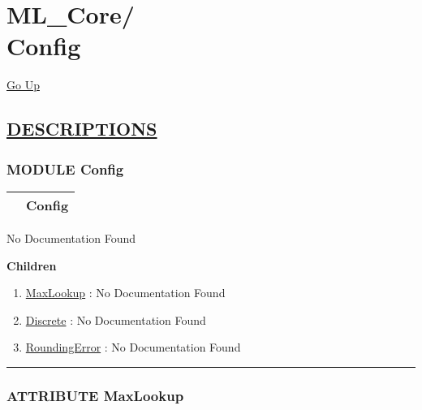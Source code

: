 \chapter*{\color{headfile}
{\large ML\_Core\slash\hspace{0pt}}
 \\
Config
}
\hypertarget{ecldoc:toc:ML_Core.Config}{}
\hyperlink{ecldoc:toc:root/ML_Core}{Go Up}


\section*{\underline{\textsf{DESCRIPTIONS}}}
\subsection*{\textsf{\colorbox{headtoc}{\color{white} MODULE}
Config}}

\hypertarget{ecldoc:ML_Core.Config}{}

{\renewcommand{\arraystretch}{1.5}
\begin{tabularx}{\textwidth}{|>{\raggedright\arraybackslash}l|X|}
\hline
\hspace{0pt}\mytexttt{\color{red} } & \textbf{Config} \\
\hline
\end{tabularx}
}

\par





No Documentation Found







\textbf{Children}
\begin{enumerate}
\item \hyperlink{ecldoc:ml_core.config.maxlookup}{MaxLookup}
: No Documentation Found
\item \hyperlink{ecldoc:ml_core.config.discrete}{Discrete}
: No Documentation Found
\item \hyperlink{ecldoc:ml_core.config.roundingerror}{RoundingError}
: No Documentation Found
\end{enumerate}

\rule{\linewidth}{0.5pt}

\subsection*{\textsf{\colorbox{headtoc}{\color{white} ATTRIBUTE}
MaxLookup}}

